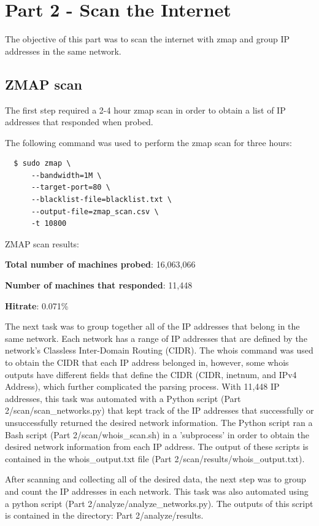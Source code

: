 \documentclass[11pt]{article}
\begin{document}
\newpage
\section*{Part 2 - Scan the Internet}
\label{sec:part-2}
The objective of this part was to scan the internet with zmap and group IP addresses in the same network.
\subsection*{ZMAP scan}
The first step required a 2-4 hour zmap scan in order to obtain a list of IP addresses that responded when probed.
\newline

\noindent The following command was used to perform the zmap scan for three hours:
\begin{verbatim}
  $ sudo zmap \
      --bandwidth=1M \
      --target-port=80 \
      --blacklist-file=blacklist.txt \
      --output-file=zmap_scan.csv \
      -t 10800
\end{verbatim}
ZMAP scan results:

\textbf{Total number of machines probed}: 16,063,066

\textbf{Number of machines that responded}: 11,448

\textbf{Hitrate}: 0.071\%
\newline

The next task was to group together all of the IP addresses that belong in the same network.
Each network has a range of IP addresses that are defined by the network's Classless Inter-Domain Routing (CIDR).
The whois command was used to obtain the CIDR that each IP address belonged in, however,
some whois outputs have different fields that define the CIDR (CIDR, inetnum, and IPv4 Address), which further complicated the parsing process.
With 11,448 IP addresses, this task was automated with a Python script (Part 2/scan/scan\_networks.py) that kept track of the IP addresses that successfully or unsuccessfully returned the desired network information.
The Python script ran a Bash script (Part 2/scan/whois\_scan.sh) in a 'subprocess' in order to obtain the desired network information from each IP address.
The output of these scripts is contained in the whois\_output.txt file (Part 2/scan/results/whois\_output.txt).

After scanning and collecting all of the desired data, the next step was to group and count the IP addresses in each network.
This task was also automated using a python script (Part 2/analyze/analyze\_networks.py).
The outputs of this script is contained in the directory: Part 2/analyze/results.
\newline
\end{document}

